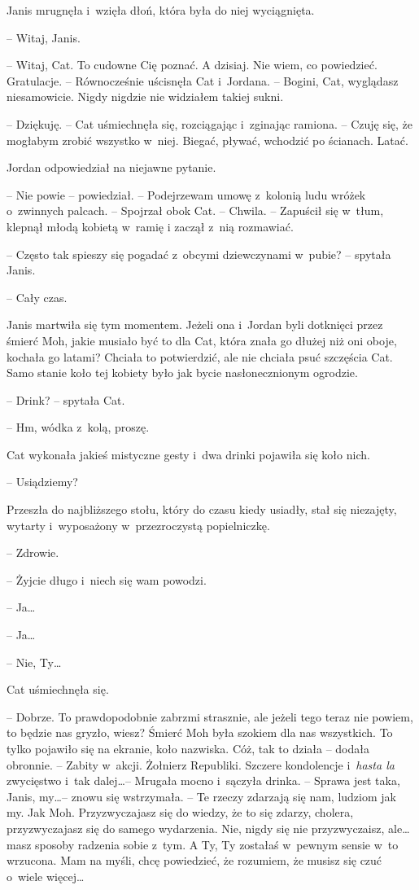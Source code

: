 \documentclass[oneside,polish,11pt,sfheadings]{mwbk}
\begin{document}
Janis mrugnęła i~wzięła dłoń, która była do niej wyciągnięta.

-- Witaj, Janis.

-- Witaj, Cat. To cudowne Cię poznać. A dzisiaj. Nie wiem, co powiedzieć.
Gratulacje. -- Równocześnie uścisnęła Cat i~Jordana. -- Bogini, Cat,
wyglądasz niesamowicie. Nigdy nigdzie nie widziałem takiej sukni.

-- Dziękuję. -- Cat uśmiechnęła się, rozciągając i~zginając ramiona. -- Czuję się, że mogłabym zrobić wszystko w~niej. Biegać, pływać, wchodzić
po ścianach. Latać.

Jordan odpowiedział na niejawne pytanie. 

-- Nie powie -- powiedział. -- Podejrzewam umowę z~kolonią ludu wróżek o~zwinnych palcach. -- Spojrzał
obok Cat. -- Chwila. -- Zapuścił się w~tłum, klepnął młodą kobietą w~ramię
i zaczął z~nią rozmawiać.

-- Często tak spieszy się pogadać z~obcymi dziewczynami w~pubie? -- spytała Janis.

-- Cały czas.

Janis martwiła się tym momentem. Jeżeli ona i~Jordan byli dotknięci
przez śmierć Moh, jakie musiało być to dla Cat, która znała go dłużej
niż oni oboje, kochała go latami? Chciała to potwierdzić, ale nie
chciała psuć szczęścia Cat. Samo stanie koło tej kobiety było jak bycie
nasłonecznionym ogrodzie.

-- Drink? -- spytała Cat.

-- Hm, wódka z~kolą, proszę.

Cat wykonała jakieś mistyczne gesty i~dwa drinki pojawiła się koło nich.

-- Usiądziemy?

Przeszła do najbliższego stołu, który do czasu kiedy usiadły, stał się
niezajęty, wytarty i~wyposażony w~przezroczystą popielniczkę.

-- Zdrowie.

-- Żyjcie długo i~niech się wam powodzi.

-- Ja\ldots

-- Ja\ldots

-- Nie, Ty\ldots

Cat uśmiechnęła się. 

-- Dobrze. To prawdopodobnie zabrzmi strasznie, ale
jeżeli tego teraz nie powiem, to będzie nas gryzło, wiesz? Śmierć Moh
była szokiem dla nas wszystkich. To tylko pojawiło się na ekranie, koło
nazwiska. Cóż, tak to działa -- dodała obronnie. -- Zabity w~akcji.
Żołnierz Republiki. Szczere kondolencje i~\emph{hasta la} zwycięstwo i~tak dalej\ldots -- Mrugała mocno i~sączyła drinka. -- Sprawa jest taka,
Janis, my\ldots -- znowu się wstrzymała. -- Te rzeczy zdarzają się nam,
ludziom jak my. Jak Moh. Przyzwyczajasz się do wiedzy, że to się zdarzy,
cholera, przyzwyczajasz się do samego wydarzenia. Nie, nigdy się nie
przyzwyczaisz, ale\ldots masz sposoby radzenia sobie z~tym. A Ty, Ty
zostałaś w~pewnym sensie w~to wrzucona. Mam na myśli, chcę powiedzieć,
że rozumiem, że musisz się czuć o~wiele więcej\ldots
\end{document}
